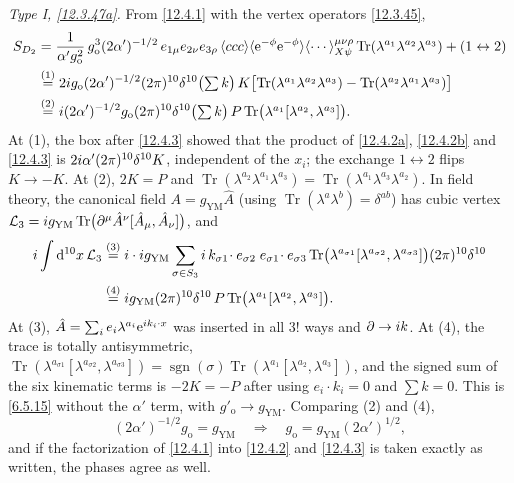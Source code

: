 \begin{tcolorbox}[breakable]
\begin{remark}
		\emph{Type I, \eqref{12.3.47a}.} From \eqref{12.4.1} with the vertex operators \eqref{12.3.45},
		\begin{align*}
			S_{D_{2}}&=\frac{1}{\alpha'g_{\mathrm o}^{2}}\,g_{\mathrm o}^{3}(2\alpha')^{-1/2}\,e_{1\mu}e_{2\nu}e_{3\rho}\,\langle ccc\rangle\langle\mathrm{e}^{-\phi}\mathrm{e}^{-\phi}\rangle\langle\cdots\rangle^{\mu\nu\rho}_{X\psi}\operatorname{Tr}(\lambda^{a_{1}}\lambda^{a_{2}}\lambda^{a_{3}})+(1\leftrightarrow2)\\
			&\overset{(1)}{=} 2i g_{\mathrm o}(2\alpha')^{-1/2}(2\pi)^{10}\delta^{10}\bigl(\textstyle\sum k\bigr)\,K\bigl[\operatorname{Tr}(\lambda^{a_{1}}\lambda^{a_{2}}\lambda^{a_{3}})-\operatorname{Tr}(\lambda^{a_{2}}\lambda^{a_{1}}\lambda^{a_{3}})\bigr]\\
			&\overset{(2)}{=} i(2\alpha')^{-1/2}g_{\mathrm o}(2\pi)^{10}\delta^{10}\bigl(\textstyle\sum k\bigr)\,P\operatorname{Tr}\bigl(\lambda^{a_{1}}[\lambda^{a_{2}},\lambda^{a_{3}}]\bigr) .
		\end{align*}
		At (1), the box after \eqref{12.4.3} showed that the product of \eqref{12.4.2a}, \eqref{12.4.2b} and \eqref{12.4.3} is $2i\alpha'(2\pi)^{10}\delta^{10}K$, independent of the $x_{i}$; the exchange $1\leftrightarrow2$ flips $K\to-K$. At (2), $2K=P$ and $\operatorname{Tr}(\lambda^{a_{2}}\lambda^{a_{1}}\lambda^{a_{3}})=\operatorname{Tr}(\lambda^{a_{1}}\lambda^{a_{3}}\lambda^{a_{2}})$. In field theory, the canonical field $A=g_{\mathrm{YM}}\hat A$ (using $\operatorname{Tr}(\lambda^{a}\lambda^{b})=\delta^{ab}$) has cubic vertex $\mathcal L_{3}=i g_{\mathrm{YM}}\operatorname{Tr}\bigl(\partial^{\mu}\hat A^{\nu}[\hat A_{\mu},\hat A_{\nu}]\bigr)$, and
		\begin{align*}
			i\int\mathrm{d}^{10}x\,\mathcal L_{3}
			&\overset{(3)}{=} i\cdot i g_{\mathrm{YM}}\sum_{\sigma\in S_{3}}i\,k_{\sigma1}\!\cdot e_{\sigma2}\;e_{\sigma1}\!\cdot e_{\sigma3}\operatorname{Tr}\bigl(\lambda^{a_{\sigma1}}[\lambda^{a_{\sigma2}},\lambda^{a_{\sigma3}}]\bigr)(2\pi)^{10}\delta^{10}\\
			&\overset{(4)}{=} i g_{\mathrm{YM}}(2\pi)^{10}\delta^{10}\,P\operatorname{Tr}\bigl(\lambda^{a_{1}}[\lambda^{a_{2}},\lambda^{a_{3}}]\bigr) .
		\end{align*}
		At (3), $\hat A=\sum_{i}e_{i}\lambda^{a_{i}}\mathrm{e}^{i k_{i}\cdot x}$ was inserted in all $3!$ ways and $\partial\to i k$. At (4), the trace is totally antisymmetric, $\operatorname{Tr}(\lambda^{a_{\sigma1}}[\lambda^{a_{\sigma2}},\lambda^{a_{\sigma3}}])=\operatorname{sgn}(\sigma)\operatorname{Tr}(\lambda^{a_{1}}[\lambda^{a_{2}},\lambda^{a_{3}}])$, and the signed sum of the six kinematic terms is $-2K=-P$ after using $e_{i}\cdot k_{i}=0$ and $\sum k=0$. This is \eqref{6.5.15} without the $\alpha'$ term, with $g'_{\mathrm o}\to g_{\mathrm{YM}}$. Comparing (2) and (4),
		\[
		(2\alpha')^{-1/2}g_{\mathrm o}=g_{\mathrm{YM}}\quad\Longrightarrow\quad g_{\mathrm o}=g_{\mathrm{YM}}(2\alpha')^{1/2} ,
		\]
		and if the factorization of \eqref{12.4.1} into \eqref{12.4.2} and \eqref{12.4.3} is taken exactly as written, the phases agree as well.


\end{remark}
\end{tcolorbox}

